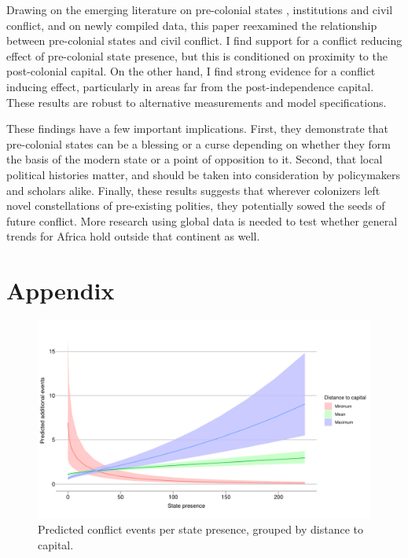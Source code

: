 \documentclass[12pt]{article}
\begin{document}
Drawing on the emerging literature on pre-colonial states \citep{Paine2019,
Depetris-Chauvin2016}, institutions \citep{Wig2016, Englebert2002,
Michalopoulos2018} and civil conflict, and on newly compiled data, this paper
reexamined the relationship between pre-colonial states and civil conflict. I
find support for a conflict reducing effect of pre-colonial state presence, but
this is conditioned on proximity to the post-colonial capital. On the other
hand, I find strong evidence for a conflict inducing effect, particularly in
areas far from the post-independence capital. These results are robust to
alternative measurements and model specifications.

These findings have a few important implications. First, they demonstrate that
pre-colonial states can be a blessing or a curse depending on whether they form
the basis of the modern state or a point of opposition to it. Second, that local
political histories matter, and should be taken into consideration by
policymakers and scholars alike. Finally, these results suggests that wherever
colonizers left novel constellations of pre-existing polities, they potentially
sowed the seeds of future conflict. More research using global data is needed to
test whether general trends for Africa hold outside that continent as well.


\pagebreak




\pagebreak
\section*{Appendix}









\begin{figure}[htpb]
	\centering
	\includegraphics[width=\linewidth]{"../R/Output/SBzinbplot.pdf"}
	\caption{Predicted conflict events per state presence, grouped by
	distance to capital.}
	\label{state_int}
\end{figure}
\end{document}

